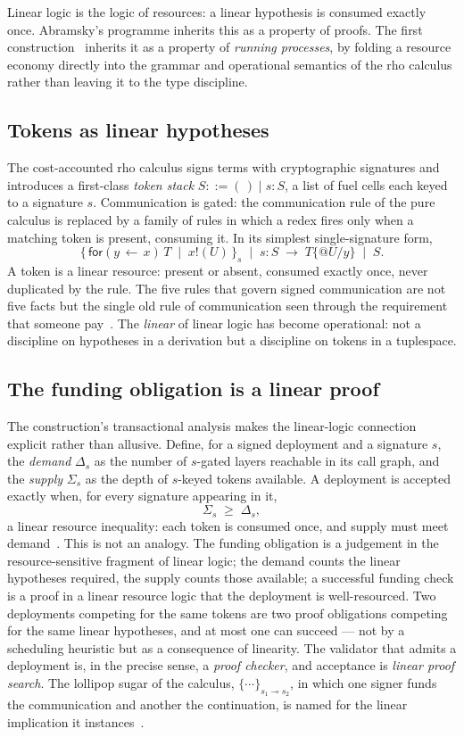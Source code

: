 \documentclass[11pt]{article}
\makeatletter
\theoremstyle{definition}
\theoremstyle{plain}
\newcommand{\quo}[1]{@#1}
\newcommand{\sig}[1]{\{#1\}}
\newcommand{\given}{\,\leftarrow\,}
\makeatother
\begin{document}
Linear logic is the logic of resources: a linear hypothesis is consumed exactly
once. Abramsky's programme inherits this as a property of proofs. The first
construction~\cite{NoteI} inherits it as a property of \emph{running processes},
by folding a resource economy directly into the grammar and operational
semantics of the rho calculus rather than leaving it to the type discipline.

\subsection{Tokens as linear hypotheses}

The cost-accounted rho calculus signs terms with cryptographic signatures and
introduces a first-class \emph{token stack} $S ::= (\,) \mid s\!:\!S$, a list of
fuel cells each keyed to a signature $s$. Communication is gated: the
communication rule of the pure calculus is replaced by a family of rules in
which a redex fires only when a matching token is present, consuming it. In its
simplest single-signature form,
\[
  \sig{\,\mathsf{for}(y \given x)\,T \;\mid\; x!(U)\,}_{s}
  \;\mid\; s\!:\!S
  \;\longrightarrow\;
  T\{\quo U / y\} \;\mid\; S .
\]
A token is a linear resource: present or absent, consumed exactly once, never
duplicated by the rule. The five rules that govern signed communication are not
five facts but the single old rule of communication seen through the
requirement that someone pay~\cite{NoteI}. The \emph{linear} of linear logic has
become operational: not a discipline on hypotheses in a derivation but a
discipline on tokens in a tuplespace.

\subsection{The funding obligation is a linear proof}

The construction's transactional analysis makes the linear-logic connection
explicit rather than allusive. Define, for a signed deployment and a signature
$s$, the \emph{demand} $\Delta_s$ as the number of $s$-gated layers reachable in
its call graph, and the \emph{supply} $\Sigma_s$ as the depth of $s$-keyed
tokens available. A deployment is accepted exactly when, for every signature
appearing in it,
\[
  \Sigma_s \;\geq\; \Delta_s ,
\]
a linear resource inequality: each token is consumed once, and supply must meet
demand~\cite{NoteI}. This is not an analogy. The funding obligation is a
judgement in the resource-sensitive fragment of linear logic; the demand counts
the linear hypotheses required, the supply counts those available; a successful
funding check is a proof in a linear resource logic that the deployment is
well-resourced. Two deployments competing for the same tokens are two proof
obligations competing for the same linear hypotheses, and at most one can
succeed --- not by a scheduling heuristic but as a consequence of linearity. The
validator that admits a deployment is, in the precise sense, a \emph{proof
checker}, and acceptance is \emph{linear proof search}. The lollipop sugar of
the calculus, $\sig{\cdots}_{s_1 \multimap s_2}$, in which one signer funds the
communication and another the continuation, is named for the linear implication
it instances~\cite{NoteI}.
\end{document}
